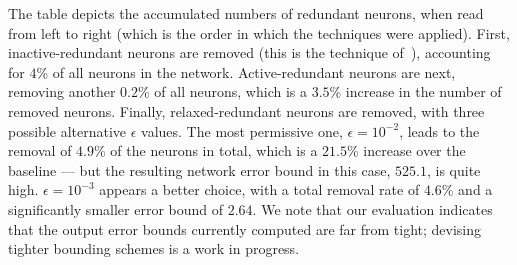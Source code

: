 \documentclass[10pt, conference, twocolumn, compsocconf]{IEEEtran}
\theoremstyle{remark}
\newcommand{\errorMinimizerFunction}{l_m}
\newcommand{\todo}[1]{{\color{red}{\textbf{[TODO]} #1}}}
\begin{document}
The table depicts the accumulated numbers of redundant neurons, when
read from left to right (which is the order in which the techniques
were applied). First, inactive-redundant neurons are removed (this is
the technique of~\cite{GoFeMaBaKa20}), accounting for $4$\% of all
neurons in the network.
Active-redundant neurons are next, removing another $0.2$\%
of all neurons, which is a $3.5$\% increase in the number of removed
neurons. Finally, relaxed-redundant neurons are removed, with three
possible alternative $\epsilon$ values. The most permissive one,
$\epsilon=10^{-2}$, leads to the removal of $4.9$\% of the neurons in
total, which is a $21.5$\% increase over the baseline --- but the
resulting network error bound in this case, $525.1$, is quite high.
$\epsilon=10^{-3}$ appears a better choice, with a total removal rate
of $4.6$\% and a significantly smaller error bound of $2.64$.  We note
that our evaluation indicates that the output error bounds currently
computed are far from tight; devising tighter bounding schemes is a
work in progress.




\end{document}
